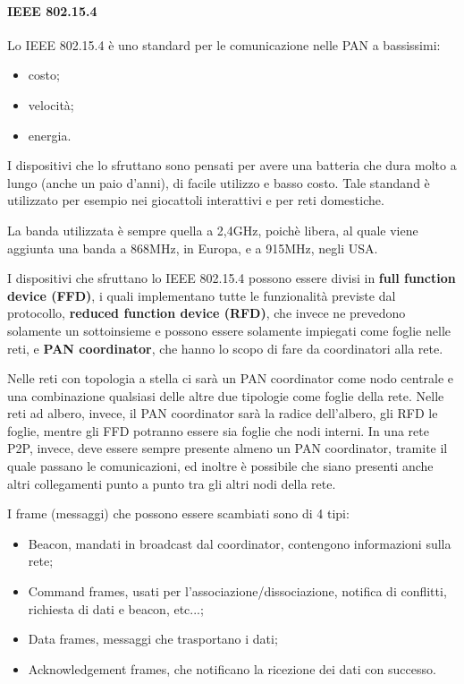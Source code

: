 \paragraph{IEEE 802.15.4}
Lo IEEE 802.15.4 è uno standard per le comunicazione nelle PAN a bassissimi:
\begin{itemize}
  \item costo;
  \item velocità;
  \item energia.
\end{itemize}

I dispositivi che lo sfruttano sono pensati per avere una batteria che dura 
molto a lungo (anche un paio d'anni), di facile utilizzo e basso costo. Tale 
standand è utilizzato per esempio nei giocattoli interattivi e per reti 
domestiche.

La banda utilizzata è sempre quella a 2,4GHz, poichè libera, al quale viene 
aggiunta una banda a 868MHz, in Europa, e a 915MHz, negli USA.

I dispositivi che sfruttano lo IEEE 802.15.4 possono essere divisi in 
\textbf{full function device (FFD)}, i quali implementano tutte le funzionalità 
previste dal protocollo, \textbf{reduced function device (RFD)}, che invece ne 
prevedono solamente un sottoinsieme e possono essere solamente impiegati come 
foglie nelle reti, e \textbf{PAN coordinator}, che hanno lo scopo di fare da 
coordinatori alla rete.

Nelle reti con topologia a stella ci sarà un PAN coordinator come nodo centrale 
e una combinazione qualsiasi delle altre due tipologie come foglie della rete. 
Nelle reti ad albero, invece, il PAN coordinator sarà la radice dell'albero, gli 
RFD le foglie, mentre gli FFD potranno essere sia foglie che nodi interni. In 
una rete P2P, invece, deve essere sempre presente almeno un PAN coordinator, 
tramite il quale passano le comunicazioni, ed inoltre è possibile che siano 
presenti anche altri collegamenti punto a punto tra gli altri nodi della rete.

I frame (messaggi) che possono essere scambiati sono di 4 tipi:
\begin{itemize}
  \item Beacon, mandati in broadcast dal coordinator, contengono informazioni 
        sulla rete;
  \item Command frames, usati per l'associazione/dissociazione, notifica di 
        conflitti, richiesta di dati e beacon, etc...;
  \item Data frames, messaggi che trasportano i dati;
  \item Acknowledgement frames, che notificano la ricezione dei dati con successo.
\end{itemize}

